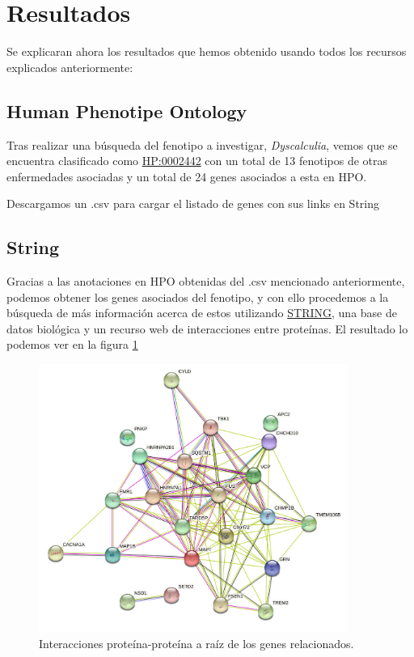 

\section{Resultados}

Se explicaran ahora los resultados que hemos obtenido usando todos los recursos explicados anteriormente:

\subsection{Human Phenotipe Ontology}

\hfill

Tras realizar una búsqueda del fenotipo a investigar, \textit{Dyscalculia}, vemos que se encuentra clasificado como \href{https://hpo.jax.org/app/browse/term/HP:0002442}{HP:0002442} con un total de 13 fenotipos de otras enfermedades asociadas y un total de 24 genes asociados a esta en HPO.

Descargamos un .csv para cargar el listado de genes con sus links en String

\subsection{String}

\hfill

Gracias a las anotaciones en HPO obtenidas del .csv mencionado anteriormente, podemos obtener los genes asociados del fenotipo, y con ello procedemos a la búsqueda de más información acerca de estos utilizando \href{https://string-db.org}{STRING}, una base de datos biológica y un recurso web de interacciones entre proteínas. El resultado lo podemos ver en la figura \ref{fig:string1}

\begin{figure}[h]
	\centering
	\includegraphics[width=0.90\textwidth]{figures/Gene_Relationship.png}
	\caption{Interacciones proteína-proteína a raíz de los genes relacionados. }
	\label{fig:string1}
\end{figure}

